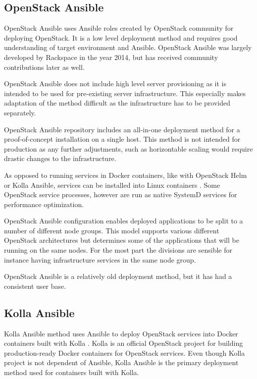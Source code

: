 \documentclass[officiallayout]{tktla}
\begin{document}
\subsection{OpenStack Ansible}

OpenStack Ansible \cite{openstack-ansible} uses Ansible roles created by
OpenStack community for deploying OpenStack. It is a low level deployment
method and requires good understanding of target environment and Ansible.
OpenStack Ansible was largely developed by Rackspace in the year 2014, but has
received community contributions later as well.

OpenStack Ansible does not include high level server provisioning as it is
intended to be used for pre-existing server infrastructure. This especially
makes adaptation of the method difficult as the infrastructure has to be
provided separately.

OpenStack Ansible repository includes an all-in-one deployment method for a
proof-of-concept installation on a single host. This method is not intended for
production as any further adjustments, such as horizontable scaling would
require drastic changes to the infrastructure.

As opposed to running services in Docker containers, like with OpenStack Helm
or Kolla Ansible, services can be installed into Linux containers
\cite{linuxcontainers}. Some OpenStack service processes, however are run as
native SystemD services for performance optimization.

OpenStack Ansible configuration enables deployed applications to be split to a
number of different node groups. This model supports various different
OpenStack architectures but determines some of the applications that will be
running on the same nodes. For the most part the divisions are sensible for
instance having infrastructure services in the same node group.

OpenStack Ansible is a relatively old deployment method, but it has had a
consistent user base.

\subsection{Kolla Ansible}

Kolla Ansible \cite{kolla-ansible} method uses Ansible to deploy OpenStack
services into Docker containers built with Kolla \cite{kolla}. Kolla is an
official OpenStack project for building production-ready Docker containers for
OpenStack services. Even though Kolla project is not dependent of Ansible,
Kolla Ansible is the primary deployment method used for containers built with
Kolla.
\end{document}
